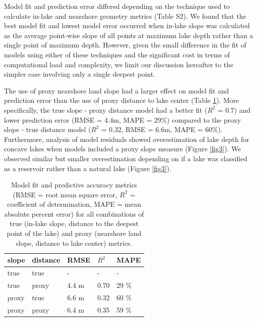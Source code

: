 \documentclass[draft]{agujournal2019}
\begin{document}
Model fit and prediction error differed depending on the technique used to calculate in-lake and nearshore geometry metrics (Table S2). We found that the best model fit and lowest model error occurred when in-lake slope was calculated as the average point-wise slope of all points at maximum lake depth rather than a single point of maximum depth. However, given the small difference in the fit of models using either of these techniques and the significant cost in terms of computational load and complexity, we limit our discussion hereafter to the simpler case involving only a single deepest point.

The use of proxy nearshore land slope had a larger effect on model fit and prediction error than the use of proxy distance to lake center (Table \ref{table1}). More specifically, the true slope - proxy distance model had a better fit ($R^2$ = 0.7) and lower prediction error (RMSE = 4.4m, MAPE = 29\%) compared to the proxy slope - true distance model ($R^2$ = 0.32, RMSE = 6.6m, MAPE = 60\%). Furthermore, analysis of model residuals showed overestimation of lake depth for concave lakes when models included a proxy slope measure (Figure \ref{fig3}). We observed similar but smaller overestimation depending on if a lake was classified as a reservoir rather than a natural lake (Figure \ref{fig3}).

\begin{table}[h]
  \caption{Model fit and predictive accuracy metrics (RMSE = root mean square error, $R^2$ = coefficient of determination, MAPE = mean absolute percent error) for all combinations of true (in-lake slope, distance to the deepest point of the lake) and proxy (nearshore land slope, distance to lake center) metrics.} \label{table1}
  \centering
\begin{tabular}{lllll}
  \hline
  slope & distance & RMSE & $R^2$ & MAPE\\
  \hline
  true & true & - & - & -\\
  true & proxy & 4.4 m & 0.70 & 29 \%\\
  proxy & true & 6.6 m & 0.32 & 60 \%\\
  proxy & proxy & 6.4 m & 0.35 & 59 \%\\
  \hline
\end{tabular}
\end{table}
\end{document}
